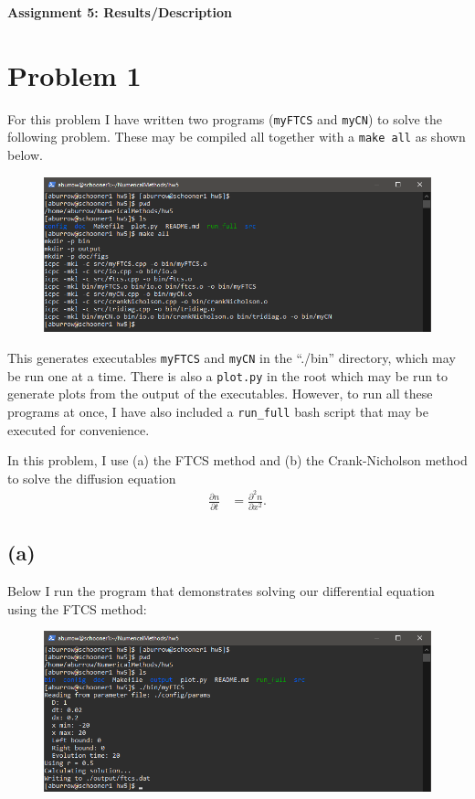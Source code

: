 \documentclass[12pt]{article}
\begin{document}
\begin{center}\begin{LARGE}
\textbf{Assignment 5: Results/Description}
\end{LARGE}\end{center}

\section*{Problem 1}

For this problem I have written two programs (\texttt{myFTCS} and
\texttt{myCN}) to solve the following problem. These may be compiled all
together with a \texttt{make all} as shown below.

\begin{figure}[H]
    \centering
    \includegraphics[width=1\textwidth]{compile}
    \label{fig:compile}
\end{figure}

This generates executables \texttt{myFTCS} and \texttt{myCN} in the ``./bin''
directory, which may be run one at a time. There is also a \texttt{plot.py} in
the root which may be run to generate plots from the output of the executables.
However, to run all these programs at once, I have also included a
\texttt{run\_full} bash script that may be executed for convenience.

In this problem, I use (a) the FTCS method and (b) the Crank-Nicholson method
to solve the diffusion equation
$$
\begin{aligned}
\frac{\partial n}{\partial t}
&= \frac{\partial^2 n}{\partial x^2}.
\end{aligned}
$$

\subsection*{(a)}

Below I run the program that demonstrates solving our differential equation
using the FTCS method:
\begin{figure}[H]
    \centering
    \includegraphics[width=1\textwidth]{myFTCS}
    \label{fig:myFTCS}
\end{figure}
\end{document}
